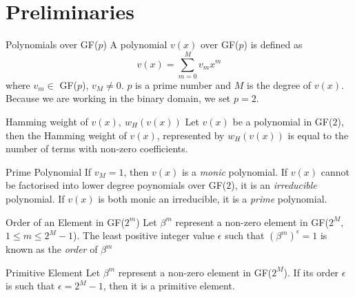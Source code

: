 \section{Preliminaries}
\label{secPrelim}
\begin{definition}{Polynomials over GF($p$) \newline}
A polynomial $v(x)$ over GF($p$) is defined as 
\begin{equation*}
v(x) = \sum_{m=0}^{M} v_mx^m
\end{equation*}
where $v_m \in $ GF($p$), $v_M \neq 0$. $p$ is a prime number and $M$ is the degree of  $v(x)$. Because we are working in the binary domain, we set $p=2$.
\end{definition}

\begin{definition}{Hamming weight of $v(x),~w_H(v(x))$\newline}
Let $v(x)$ be a polynomial in GF($2$), then the Hamming weight of $v(x)$, represented by $w_H(v(x))$ is equal to the number of terms with non-zero coefficients.
\end{definition}

\begin{definition}{Prime Polynomial \newline}
If $v_M=1$, then $v(x)$ is a \textit{monic} polynomial. If $v(x)$ cannot be factorised into lower degree poynomials over GF($2$), it is an \textit{irreducible} polynomial. If $v(x)$ is both monic an irreducible, it is a \textit{prime} polynomial.
\end{definition}

\begin{definition}{Order of an Element in GF($2^m$) \newline}
Let $\beta^m$ represent a non-zero element in GF($2^M$, $1 \leq m \leq 2^M-1$). The least positive integer value $\epsilon$ such that $(\beta^m)^{\epsilon}=1$ is known as the \textit{order} of $\beta^m$
\end{definition}

\begin{definition}{Primitive Element \newline}
Let $\beta^m$ represent a non-zero element in GF($2^M$). If its order $\epsilon$ is such that $\epsilon=2^M-1$, then it is a primitive element.
\end{definition}

